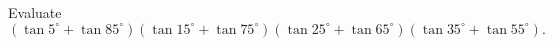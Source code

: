 Evaluate \[(\tan 5^\circ+\tan 85^\circ)(\tan 15^\circ+\tan 75^\circ)(\tan 25^\circ+\tan 65^\circ)(\tan 35^\circ+\tan 55^\circ).\]
